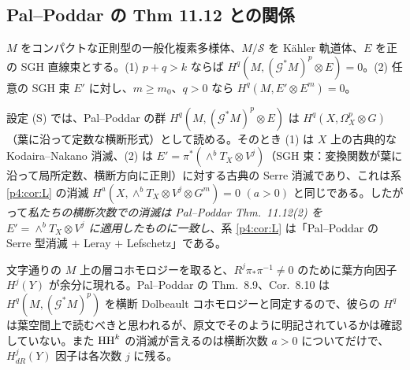 \subsection{Pal--Poddar の Thm 11.12 との関係}\label{p4:sec:PP}
\begin{thm}\tC
$M$ をコンパクトな正則型の一般化複素多様体、$M/\mathcal S$ を Kähler 軌道体、$E$ を正の SGH 直線束とする。(1) $p+q>k$ ならば $H^q(M,(\mathcal G^*M)^p\otimes E)=0$。(2) 任意の SGH 束 $E'$ に対し、$m\ge m_0$、$q>0$ なら $H^q(M,E'\otimes E^m)=0$。
\end{thm}
\begin{prop}\tP\label{p4:prop:PPcompare}
設定 (S) では、Pal--Poddar の群 $H^q(M,(\mathcal G^*M)^p\otimes E)$ は $H^q(X,\Omega^p_X\otimes G)$（葉に沿って定数な横断形式）として読める。そのとき (1) は $X$ 上の古典的な Kodaira--Nakano 消滅、(2) は $E'=\pi^*(\wedge^bT_X\otimes V^j)$（SGH 束：変換関数が葉に沿って局所定数、横断方向に正則）に対する古典の Serre 消滅であり、これは系 \ref{p4:cor:L} の消滅 $H^a(X,\wedge^bT_X\otimes V^j\otimes G^m)=0$ $(a>0)$ と同じである。したがって\emph{私たちの横断次数での消滅は Pal--Poddar Thm.\ 11.12(2) を $E'=\wedge^bT_X\otimes V^j$ に適用したものに一致し}、系 \ref{p4:cor:L} は「Pal--Poddar の Serre 型消滅 $+$ Leray $+$ Lefschetz」である。
\end{prop}
\begin{rem}[\tQ]
文字通りの $M$ 上の層コホモロジーを取ると、$R^j\pi_*\pi^{-1}\neq0$ のために葉方向因子 $H^j(Y)$ が余分に現れる。Pal--Poddar の Thm.\ 8.9、Cor.\ 8.10 は $H^q(M,(\mathcal G^*M)^p)$ を横断 Dolbeault コホモロジーと同定するので、彼らの $H^q$ は葉空間上で読むべきと思われるが、原文でそのように明記されているかは確認していない。また $\mathrm{HH}^k$ の消滅が言えるのは横断次数 $a>0$ についてだけで、$H^j_{dR}(Y)$ 因子は各次数 $j$ に残る。
\end{rem}

